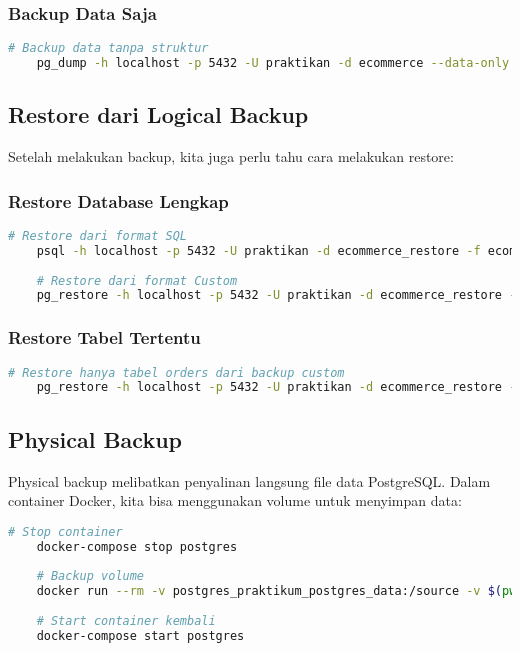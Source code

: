 \subsubsection{Backup Data Saja}
\begin{lstlisting}[language=bash]
	# Backup data tanpa struktur
	pg_dump -h localhost -p 5432 -U praktikan -d ecommerce --data-only -f ecommerce_data.sql
\end{lstlisting}

\subsection{Restore dari Logical Backup}
Setelah melakukan backup, kita juga perlu tahu cara melakukan restore:

\subsubsection{Restore Database Lengkap}
\begin{lstlisting}[language=bash]
	# Restore dari format SQL
	psql -h localhost -p 5432 -U praktikan -d ecommerce_restore -f ecommerce_full.sql
	
	# Restore dari format Custom
	pg_restore -h localhost -p 5432 -U praktikan -d ecommerce_restore -v ecommerce_full.dump
\end{lstlisting}

\subsubsection{Restore Tabel Tertentu}
\begin{lstlisting}[language=bash]
	# Restore hanya tabel orders dari backup custom
	pg_restore -h localhost -p 5432 -U praktikan -d ecommerce_restore -t orders -v ecommerce_full.dump
\end{lstlisting}

\subsection{Physical Backup}
Physical backup melibatkan penyalinan langsung file data PostgreSQL. Dalam container Docker, kita bisa menggunakan volume untuk menyimpan data:

\begin{lstlisting}[language=bash]
	# Stop container
	docker-compose stop postgres
	
	# Backup volume
	docker run --rm -v postgres_praktikum_postgres_data:/source -v $(pwd)/backup:/backup ubuntu tar -czf /backup/postgres_data_backup.tar.gz -C /source .
	
	# Start container kembali
	docker-compose start postgres
\end{lstlisting}

